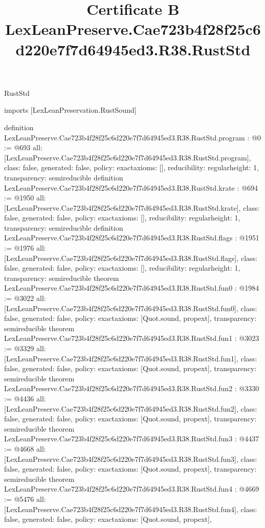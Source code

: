 \begin{lexlean}{RustStd}
\title{Certificate B LexLeanPreserve.Cae723b4f28f25c6d220e7f7d64945ed3.R38.RustStd}
\begin{coremodule}
imports [LexLeanPreservation.RustSound]

definition LexLeanPreserve.Cae723b4f28f25c6d220e7f7d64945ed3.R38.RustStd.program : @0 := @693 {
  all: [LexLeanPreserve.Cae723b4f28f25c6d220e7f7d64945ed3.R38.RustStd.program],
  class: false,
  generated: false,
  policy: exact{axioms: []},
  reducibility: regular{height: 1},
  transparency: semireducible
}
definition LexLeanPreserve.Cae723b4f28f25c6d220e7f7d64945ed3.R38.RustStd.krate : @694 := @1950 {
  all: [LexLeanPreserve.Cae723b4f28f25c6d220e7f7d64945ed3.R38.RustStd.krate],
  class: false,
  generated: false,
  policy: exact{axioms: []},
  reducibility: regular{height: 1},
  transparency: semireducible
}
definition LexLeanPreserve.Cae723b4f28f25c6d220e7f7d64945ed3.R38.RustStd.flags : @1951 := @1976 {
  all: [LexLeanPreserve.Cae723b4f28f25c6d220e7f7d64945ed3.R38.RustStd.flags],
  class: false,
  generated: false,
  policy: exact{axioms: []},
  reducibility: regular{height: 1},
  transparency: semireducible
}
theorem LexLeanPreserve.Cae723b4f28f25c6d220e7f7d64945ed3.R38.RustStd.fun0 : @1984 := @3022 {
  all: [LexLeanPreserve.Cae723b4f28f25c6d220e7f7d64945ed3.R38.RustStd.fun0],
  class: false,
  generated: false,
  policy: exact{axioms: [Quot.sound, propext]},
  transparency: semireducible
}
theorem LexLeanPreserve.Cae723b4f28f25c6d220e7f7d64945ed3.R38.RustStd.fun1 : @3023 := @3329 {
  all: [LexLeanPreserve.Cae723b4f28f25c6d220e7f7d64945ed3.R38.RustStd.fun1],
  class: false,
  generated: false,
  policy: exact{axioms: [Quot.sound, propext]},
  transparency: semireducible
}
theorem LexLeanPreserve.Cae723b4f28f25c6d220e7f7d64945ed3.R38.RustStd.fun2 : @3330 := @4436 {
  all: [LexLeanPreserve.Cae723b4f28f25c6d220e7f7d64945ed3.R38.RustStd.fun2],
  class: false,
  generated: false,
  policy: exact{axioms: [Quot.sound, propext]},
  transparency: semireducible
}
theorem LexLeanPreserve.Cae723b4f28f25c6d220e7f7d64945ed3.R38.RustStd.fun3 : @4437 := @4668 {
  all: [LexLeanPreserve.Cae723b4f28f25c6d220e7f7d64945ed3.R38.RustStd.fun3],
  class: false,
  generated: false,
  policy: exact{axioms: [Quot.sound, propext]},
  transparency: semireducible
}
theorem LexLeanPreserve.Cae723b4f28f25c6d220e7f7d64945ed3.R38.RustStd.fun4 : @4669 := @5476 {
  all: [LexLeanPreserve.Cae723b4f28f25c6d220e7f7d64945ed3.R38.RustStd.fun4],
  class: false,
  generated: false,
  policy: exact{axioms: [Quot.sound, propext]},
}
\end{coremodule}
\end{lexlean}
